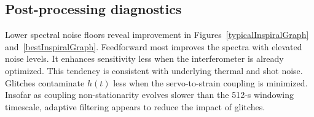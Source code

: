         \subsection{Post-processing diagnostics}
        \label{diagnostics}
 

Lower spectral noise floors reveal improvement in Figures~\ref{typicalInspiralGraph} and~\ref{bestInspiralGraph}. Feedforward most improves the spectra with elevated noise levels. It enhances sensitivity less when the interferometer is already optimized. This tendency is consistent with underlying thermal and shot noise. Glitches contaminate $h(t)$ less when the servo-to-strain coupling is minimized. Insofar as coupling non-stationarity evolves slower than the 512-s windowing timescale, adaptive filtering appears to reduce the impact of glitches.

